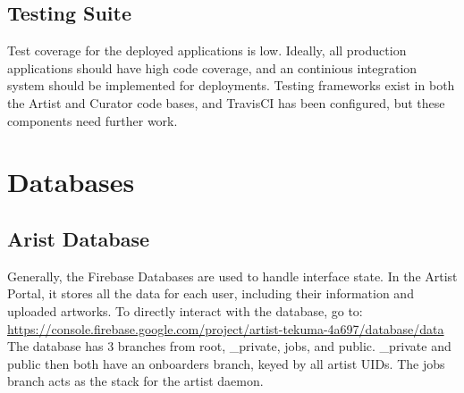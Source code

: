 \documentclass[fontsize=12pt]{scrartcl} %
\begin{document}
\subsection{Testing Suite}
Test coverage for the deployed applications is low. Ideally, all production applications should have high code coverage, and an continious integration system should be implemented for deployments. Testing frameworks exist in both the Artist and Curator code bases, and TravisCI has been configured, but these components need further work.

\section{Databases}
\subsection{Arist Database}
Generally, the Firebase Databases are used to handle interface state. In the Artist Portal, it stores all the data for each user, including their information and uploaded artworks. To directly interact with the database, go to:\\
\url{https://console.firebase.google.com/project/artist-tekuma-4a697/database/data} \\
The database has 3 branches from root, \_private, jobs, and public. \_private and public then both have an onboarders branch, keyed by all artist UIDs. The jobs branch acts as the stack for the artist daemon.
\end{document}

